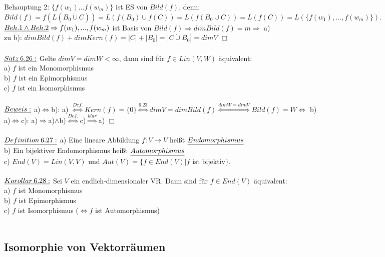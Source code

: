 \documentclass[fleqn, a4paper, 11pt]{scrartcl}
\theoremstyle{definition}
\begin{document}
Behauptung 2: $\{f(w_1)...f(w_m)\}$ ist ES von $Bild(f)$, denn: $Bild(f)=f(L(B_0\mathbin{\dot{\cup}}C))=L(f(B_0)\cup f(C))=L(f(B_0\cup C))=L(f(C))=L(\{f(w_1),...,f(w_m)\})$.\\
$\uline{Beh.1\wedge Beh.2} \Rightarrow f(w_1),...,f(w_m)$ ist Basis von $Bild(f)\Rightarrow dim Bild(f)=m\Rightarrow$ a)\\
zu b): $dim Bild(f)+dim Kern(f)=|C|+|B_0|=|C\mathbin{\dot{\cup}}B_0|=dim V$ \hfill $\Box$\\
\\
$\uline{Satz\:6.26:}$ Gelte $dim V=dim W<\infty$, dann sind für $f\in Lin(V,W)$ äquivalent:\\
a) $f$ ist ein Monomorphismus\\
b) $f$ ist ein Epimorphismus\\
c) $f$ ist ein Isomorphismus\\
\\
$\uline{Beweis:}$ a)$\Leftrightarrow$b): a) $\stackrel{Def.}{\Leftrightarrow} Kern(f)=\{0\}\stackrel{6.23}{\Leftrightarrow} dim V= dim Bild(f)\stackrel{dim W=dim V}{\Leftrightarrow} Bild(f)=W\Leftrightarrow$ b)\\
a)$\Leftrightarrow$c): a)$\Rightarrow$a)$\wedge$b)$\stackrel{Def.}{\Leftrightarrow}$c)$\stackrel{klar}{\Rightarrow}$a) \hfill $\Box$\\
\\
$\uline{Definition\:6.27:}$ a) Eine lineare Abbildung $f:V\rightarrow V$ heißt $\uline{Endomorphismus}$\\
b) Ein bijektiver Endomorphismus heißt $\uline{Automorphismus}$\\
c) $End(V)=Lin(V,V)$ und $Aut(V)=\{f\in End(V)|f\text{ ist bijektiv}\}$.\\
\\
$\uline{Korollar\:6.28:}$ Sei $V$ ein endlich-dimensionaler VR. Dann sind für $f\in End(V)$ äquivalent:\\
a) $f$ ist Monomorphismus\\
b) $f$ ist Epimorphismus\\
c) $f$ ist Isomorphismus ($\Leftrightarrow f$ ist Automorphismus)\\
\\
\subsection{Isomorphie von Vektorräumen}
\end{document}
